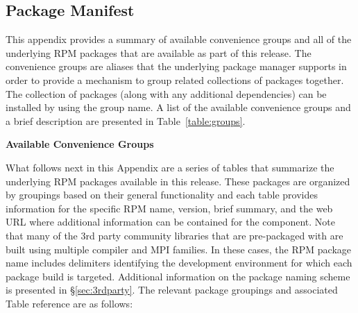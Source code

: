 \clearpage

\newcommand{\captionSpace}{-0.15cm}
\newcommand{\tabSpaceBot}{1.0cm}
\captionsetup{justification=raggedright,singlelinecheck=false}


\subsection{Package Manifest} \label {appendix:manifest}

\vspace*{0.25cm}
This appendix provides a summary of available convenience groups and all of the
underlying RPM packages that are available as part of this \OHPC{} release. The
convenience groups are aliases that the underlying package manager supports in
order to provide a mechanism to group related collections of packages
together. The collection of packages (along with any additional dependencies)
can be installed by using the group name. A list of the available convenience
groups and a brief description are presented in Table~\ref{table:groups}.

\vspace*{1.25cm}
\begin{table}[h] 
\caption{\bf Available \OHPC{} Convenience Groups} \vspace*{\captionSpace{}}
\label{table:groups}

\end{table}

\newpage
What follows next in this Appendix are a series of tables that summarize the
underlying RPM packages available in this \OHPC{} release. These packages are
organized by groupings based on their general functionality and each table
provides information for the specific RPM name, version, brief summary, and the
web URL where additional information can be contained for the component. Note
that many of the 3rd party community libraries that are pre-packaged
with \OHPC{} are built using multiple compiler and MPI families. In these cases,
the RPM package name includes delimiters identifying the development
environment for which each package build is targeted.  Additional information
on the \OHPC{} package naming scheme is presented in \S\ref{sec:3rdparty}. 
The relevant package groupings and associated Table reference are as follows:

